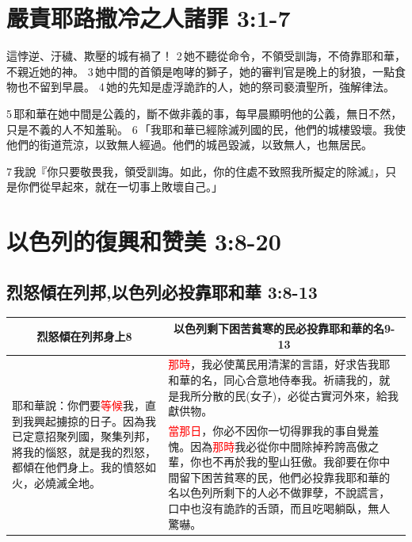 \section{嚴責耶路撒冷之人諸罪 3:1-7}
這悖逆、汙穢、欺壓的城有禍了！ 2 她不聽從命令，不領受訓誨，不倚靠耶和華，不親近她的神。 3 她中間的首領是咆哮的獅子，她的審判官是晚上的豺狼，一點食物也不留到早晨。 4 她的先知是虛浮詭詐的人，她的祭司褻瀆聖所，強解律法。 

5 耶和華在她中間是公義的，斷不做非義的事，每早晨顯明他的公義，無日不然，只是不義的人不知羞恥。 6 「我耶和華已經除滅列國的民，他們的城樓毀壞。我使他們的街道荒涼，以致無人經過。他們的城邑毀滅，以致無人，也無居民。 

7 我說『你只要敬畏我，領受訓誨。如此，你的住處不致照我所擬定的除滅』，只是你們從早起來，就在一切事上敗壞自己。」

\section{以色列的復興和赞美 3:8-20}
\subsection{烈怒傾在列邦,以色列必投靠耶和華 3:8-13}
\begin{table}[H]
\centering
\begin{tabular}{p{4.25cm}|p{}}\hline\hline
\multicolumn{1}{c|}{烈怒傾在列邦身上8}&\multicolumn{1}{c}{以色列剩下困苦貧寒的民必投靠耶和華的名9-13}\\\hline
\multirow{2}{4.5cm}{耶和華說：你們要\textcolor{red}{等候}我，直到我興起擄掠的日子。因為我已定意招聚列國，聚集列邦，將我的惱怒，就是我的烈怒，都傾在他們身上。我的憤怒如火，必燒滅全地。}
&\textcolor{red}{那時}，我必使萬民用清潔的言語，好求告我耶和華的名，同心合意地侍奉我。祈禱我的，就是我所分散的民(女子)，必從古實河外來，給我獻供物。\\\cline{2-2}
&\textcolor{red}{當那日}，你必不因你一切得罪我的事自覺羞愧。因為\textcolor{red}{那時}我必從你中間除掉矜誇高傲之輩，你也不再於我的聖山狂傲。我卻要在你中間留下困苦貧寒的民，他們必投靠我耶和華的名以色列所剩下的人必不做罪孽，不說謊言，口中也沒有詭詐的舌頭，而且吃喝躺臥，無人驚嚇。\\\hline
\end{tabular}
\end{table}


